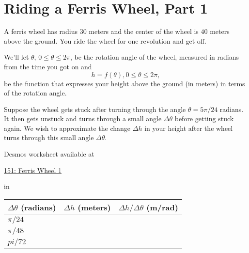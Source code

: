 \documentclass{ximera}
\newcommand{\pskip}{\vskip 0.1 in}
\begin{document}
\section{Riding a Ferris Wheel, Part 1}

\begin{example} \label{Exdfgt4ttth4}
A ferris wheel has radius $30$ meters and the center of the wheel is $40$ meters above the ground. You ride the wheel for one revolution and get off.

We'll let $\theta$, $0\leq \theta \leq 2\pi$, be the rotation angle of the wheel, measured in radians from the time you got on and 
\[
   h = f(\theta) , 0\leq \theta \leq 2\pi,
\]
be the function that expresses your height above the ground (in meters) in terms of the rotation angle.

Suppose the wheel gets stuck after turning through the angle $\theta = 5\pi/24$ radians. It then gets unstuck and turns through a small angle $\Delta \theta$ before getting stuck again. We wish to approximate the change $\Delta h$ in your height after the wheel turns through this small angle $\Delta \theta$.

 
\begin{onlineOnly}
    \begin{center}
\end{center}
\end{onlineOnly}

Desmos worksheet available at

\href{https://www.desmos.com/calculator/cxjdzyfa8s}{151: Ferris Wheel 1}


\pskip

\begin{center}
  \begin{tabular}{ | l | c | r |}
    \hline
    $\Delta \theta$ (radians) & $\Delta h$ (meters) & $\Delta h/\Delta \theta$ (m/rad) \\ \hline
    $\pi/24$ &  &  \\ \hline
    $\pi/48$ &  &  \\  \hline
    $pi/72$  &   &  \\
    \hline
  \end{tabular}
\end{center}

\end{example}
\end{document}
